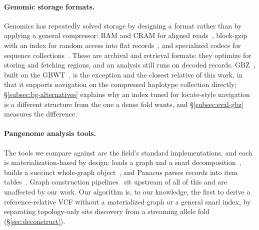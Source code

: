 \paragraph{Genomic storage formats.}
Genomics has repeatedly solved storage by designing a format rather than by
applying a general compressor: BAM and CRAM for aligned
reads~\cite{li2009sequence,bonfield2022cram}, block-gzip with an index for random
access into flat records~\cite{li2011tabix}, and specialized codecs for
sequence collections~\cite{yang2024gpufastqlz}. These are archival and
retrieval formats: they optimize for storing and fetching regions, and an analysis
still runs on decoded records. GBZ~\cite{siren2022gbz}, built on the
GBWT~\cite{siren2020haplotype,siren2021pangenomics}, is the exception and the
closest relative of this work, in that it supports navigation on the compressed
haplotype collection directly; \S\ref{subsec:bg-alternatives} explains why an index
tuned for locate-style navigation is a different structure from the one a dense
fold wants, and \S\ref{subsec:eval-gbz} measures the difference.

\paragraph{Pangenome analysis tools.}
The tools we compare against are the field's standard implementations, and each is
materialization-based by design:  loads a graph and a snarl
decomposition~\cite{garrison2018variation,hickey2020genotyping,paten2018superbubbles},
 builds a succinct whole-graph object~\cite{guarracino2022odgi}, and
Panacus parses records into item tables~\cite{parmigiani2024panacus}. Graph
construction pipelines~\cite{hickey2024pangenome,garrison2024building} sit upstream
of all of this and are unaffected by our work. Our  algorithm is,
to our knowledge, the first to derive a reference-relative VCF without a
materialized graph or a general snarl index, by separating topology-only site
discovery from a streaming allele fold (\S\ref{sec:deconstruct}).
